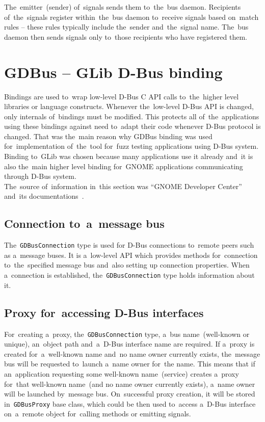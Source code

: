 The~emitter~(sender) of~signals sends them to~the~bus daemon. Recipients
of~the~signals register within~the~bus daemon to~receive signals based on~match
rules -- these rules typically include the~sender and~the~signal name.
The~bus daemon then sends signals only to~those recipients who have registered
them.\\


\section{GDBus -- GLib D-Bus binding}
Bindings are used to~wrap low-level D-Bus C API calls to~the~higher level
libraries or language constructs. Whenever the~low-level D-Bus API is changed,
only internals of~bindings must be modified. This protects all of~the~applications
using these bindings against need to~adapt their code whenever D-Bus protocol is
changed. That was the~main reason why GDBus binding was used for~implementation
of~the~tool for~fuzz testing applications using D-Bus system. Binding to~GLib was
chosen because many applications use it already and~it is also the~main higher level
binding for~GNOME applications communicating through \mbox{D-Bus} system.\\

The~source of~information in~this section was ``GNOME Developer Center''
and~its documentations~\cite{GNOMElow, GNOMEhigh}.\\

\subsection{Connection to~a~message bus}
The~\texttt{GDBusConnection} type is used for D-Bus connections to~remote peers
such as a~message buses. It is a~low-level API which provides methods
for~connection to~the~specified message bus and~also setting up connection
properties. When a~connection is established, the~\texttt{GDBusConnection} type
holds information about it.

\subsection{Proxy for~accessing D-Bus interfaces}
For~creating a~proxy, the~\texttt{GDBusConnection} type, a~bus name~(well-known
or unique), an~object path and~a~D-Bus interface name are required. If a~proxy is
created for~a~well-known name and~no name owner currently exists, the~message bus
will be requested to~launch a~name owner for~the name. This means that if
an~application requesting some well-known name~(service) creates a~proxy for~that
well-known name~(and no name owner currently exists), a~name owner will be launched
by~message bus. On~successful proxy creation, it will be stored
in~\texttt{GDBusProxy} base class, which could be then used to~access a~D-Bus
interface on~a~remote object for~calling methods or emitting signals.

